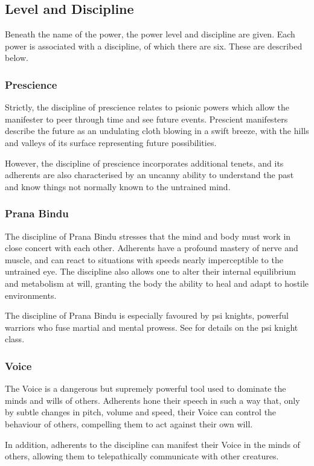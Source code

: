 \subsection{Level and Discipline}
Beneath the name of the power,
the power level and discipline are given.
Each power is associated with a discipline,
of which there are six.
These are described below.

\subsubsection{Prescience}
Strictly, the discipline of prescience relates to psionic powers
which allow the manifester to peer through time and see future events.
Prescient manifesters describe the future as
an undulating cloth blowing in a swift breeze,
with the hills and valleys of its surface representing
future possibilities. 

However,
the discipline of prescience incorporates additional tenets,
and its adherents are also characterised by an uncanny ability to
understand the past and know things not normally known to
the untrained mind.

\subsubsection{Prana Bindu}
The discipline of Prana Bindu stresses that the mind and body
must work in close concert with each other.
Adherents have a profound mastery of nerve and muscle,
and can react to situations with speeds nearly imperceptible
to the untrained eye.
The discipline also allows one to alter their internal equilibrium
and metabolism at will,
granting the body the ability to heal and adapt to hostile environments.

The discipline of Prana Bindu is especially favoured by psi knights,
powerful warriors who fuse martial and mental prowess.
See  for details on the psi knight class.

\subsubsection{Voice}
The Voice is a dangerous but supremely powerful tool
used to dominate the minds and wills of others.
Adherents hone their speech in such a way that,
only by subtle changes in pitch, volume and speed,
their Voice can control the behaviour of others,
compelling them to act against their own will.

In addition, adherents to the discipline can manifest their Voice
in the minds of others, allowing them to telepathically
communicate with other creatures.

